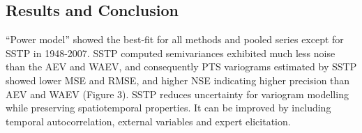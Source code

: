 \documentclass[a0,portrait]{a0poster}
\begin{document}
\begin{multicols}{2}
\color{SaddleBrown} %

\section*{Results and Conclusion}

``Power model'' showed the best-fit for all methods and pooled series except for SSTP in 1948-2007. SSTP computed semivariances exhibited much less noise than the AEV and WAEV, and consequently PTS variograms estimated by SSTP showed lower MSE and RMSE, and higher NSE indicating higher precision than AEV and WAEV (Figure 3). SSTP reduces uncertainty for variogram modelling while preserving spatiotemporal properties. It can be improved by including temporal autocorrelation, external variables and expert elicitation.
%
%



\end{multicols}
\end{document}
